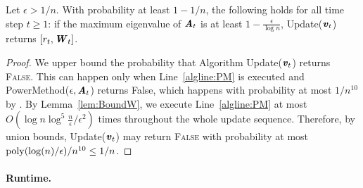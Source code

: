 \begin{lemma}\label{lem:DynCorrectAns}
Let $\epsilon>1/n$. With probability at least $1-1/n$, the following holds for all time step $t \ge 1$: 
if the maximum eigenvalue of $\AA_t$ is at least $1-\frac{\epsilon}{\log n}$, {\sc Update}($\vv_t$) returns $[r_t,\WW_t]$.
\end{lemma}
\begin{proof}
We upper bound the probability that Algorithm {\sc Update}($\vv_t$) returns \textsc{False}. This can happen only when  Line~\ref{algline:PM} is executed and {\sc PowerMethod}($\epsilon,\AA_t$) returns {\sc False}, which happens with probability at most $1/n^{10}$ by .
By Lemma~\ref{lem:BoundW}, we execute Line~\ref{algline:PM} at most $O(\log n\log^5\frac{n}{\epsilon}/\epsilon^2)$ times throughout the whole update sequence. Therefore, by union bounds, {\sc Update}($\vv_t$) may return \textsc{False} with probability at most $\poly(\log(n)/\eps)/n^{10} \le 1/n$.
\end{proof}



\paragraph{Runtime.}\label{sec:runtime}

